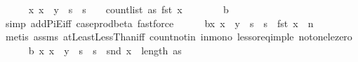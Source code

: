 \begin{isabellebody}
\ \ \ \ \isamarkupfalse%
\ {\isachardoublequoteopen}{\isasymAnd}x{\isachardot}{\kern0pt}\ x\ {\isasymin}\ y\ {\isacharbackquote}{\kern0pt}\ {\isacharparenleft}{\kern0pt}{\isacharbraceleft}{\kern0pt}{}{\isachardot}{\kern0pt}{\isachardot}{\kern0pt}{\isacharless}{\kern0pt}s\ {\isasymtimes}\ {\isacharbraceleft}{\kern0pt}{}{\isachardot}{\kern0pt}{\isachardot}{\kern0pt}{\isacharless}{\kern0pt}s\ {\isasymLongrightarrow}\ {}\ {\isasymle}\ count{\isacharunderscore}{\kern0pt}list\ as\ {\isacharparenleft}{\kern0pt}fst\ x{\isacharparenright}{\kern0pt}{\isachardoublequoteclose}\isanewline
\ \ \ \ \ \ \isamarkupfalse%
\ b{}\ \isamarkupfalse%
\ {\isacharparenleft}{\kern0pt}simp\ add{\isacharcolon}{\kern0pt}PiE{\isacharunderscore}{\kern0pt}iff\ case{\isacharunderscore}{\kern0pt}prod{\isacharunderscore}{\kern0pt}beta{\isacharcomma}{\kern0pt}\ fastforce{\isacharparenright}{\kern0pt}\isanewline
\ \ \ \ \isamarkupfalse%
\ b{}{\isacharcolon}{\kern0pt}{\isachardoublequoteopen}{\isasymAnd}x{\isachardot}{\kern0pt}\ x\ {\isasymin}\ y\ {\isacharbackquote}{\kern0pt}\ {\isacharparenleft}{\kern0pt}{\isacharbraceleft}{\kern0pt}{}{\isachardot}{\kern0pt}{\isachardot}{\kern0pt}{\isacharless}{\kern0pt}s\ {\isasymtimes}\ {\isacharbraceleft}{\kern0pt}{}{\isachardot}{\kern0pt}{\isachardot}{\kern0pt}{\isacharless}{\kern0pt}s\ {\isasymLongrightarrow}\ fst\ x\ {\isasymle}\ n{\isachardoublequoteclose}\isanewline
\ \ \ \ \ \ \isamarkupfalse%
\ {\isacharparenleft}{\kern0pt}metis\ assms{\isacharparenleft}{\kern0pt}{}{\isacharparenright}{\kern0pt}\ atLeastLessThan{\isacharunderscore}{\kern0pt}iff\ count{\isacharunderscore}{\kern0pt}notin\ in{\isacharunderscore}{\kern0pt}mono\ less{\isacharunderscore}{\kern0pt}or{\isacharunderscore}{\kern0pt}eq{\isacharunderscore}{\kern0pt}imp{\isacharunderscore}{\kern0pt}le\ not{\isacharunderscore}{\kern0pt}one{\isacharunderscore}{\kern0pt}le{\isacharunderscore}{\kern0pt}zero{\isacharparenright}{\kern0pt}\isanewline
\ \ \ \ \isamarkupfalse%
\ b{}{\isacharcolon}{\kern0pt}\ {\isachardoublequoteopen}{\isasymAnd}x{\isachardot}{\kern0pt}\ x\ {\isasymin}\ y\ {\isacharbackquote}{\kern0pt}\ {\isacharparenleft}{\kern0pt}{\isacharbraceleft}{\kern0pt}{}{\isachardot}{\kern0pt}{\isachardot}{\kern0pt}{\isacharless}{\kern0pt}s\ {\isasymtimes}\ {\isacharbraceleft}{\kern0pt}{}{\isachardot}{\kern0pt}{\isachardot}{\kern0pt}{\isacharless}{\kern0pt}s\ {\isasymLongrightarrow}\ snd\ x\ {\isasymle}\ length\ as{\isachardoublequoteclose}\isanewline

\end{isabellebody}

